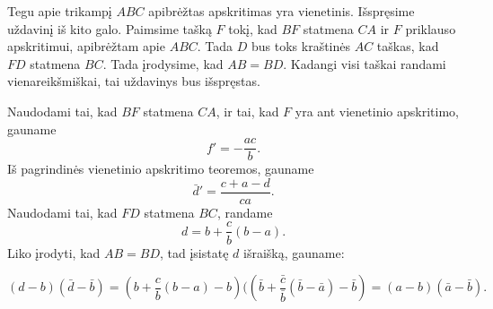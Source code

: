 \documentclass[11pt,a4paper,twoside]{book}
\begin{document}
\begin{sprendimas}
Tegu apie trikampį $ABC$ apibrėžtas apskritimas yra vienetinis. Išspręsime uždavinį iš kito galo. Paimsime tašką $F$ tokį, kad $BF$ statmena $CA$ ir $F$ priklauso apskritimui, apibrėžtam apie $ABC$. Tada $D$ bus toks kraštinės $AC$ taškas, kad $FD$ statmena $BC$. Tada įrodysime, kad $AB=BD$. Kadangi visi taškai randami vienareikšmiškai, tai uždavinys bus išspręstas.

Naudodami tai, kad $BF$ statmena $CA$, ir tai, kad $F$ yra ant vienetinio apskritimo, gauname
$$ f'= - \frac {ac}{b}.$$
Iš pagrindinės vienetinio apskritimo teoremos, gauname 
$$\bar d' = \frac {c+a-d}{ca}.$$
Naudodami tai, kad $FD$ statmena $BC$, randame
$$ d= b+ \frac {c}{b}(b-a).$$
Liko įrodyti, kad $AB=BD$, tad įsistatę $d$ išraišką, gauname:

$$ (d-b)( \bar d - \bar b)=( b+ \frac {c}{b}(b-a)-b)(( \bar b+ \frac {\bar c}{\bar b}(\bar b-\bar a)-\bar b)=(a-b)( \bar a - \bar b).$$
\end{sprendimas}
\end{document}
